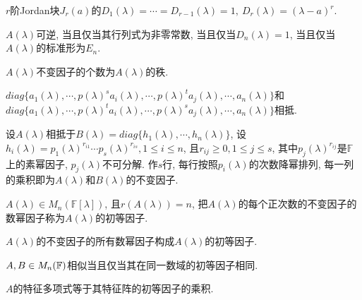 
\begin{example}
    $r$阶Jordan块$J_r(a)$的$D_1(\lambda)=\cdots=D_{r-1}(\lambda)=1,\ D_r(\lambda)=(\lambda-a)^r$.
\end{example}

\begin{example}
    $A(\lambda)$可逆, 当且仅当其行列式为非零常数, 当且仅当$D_n(\lambda)=1$, 当且仅当$A(\lambda)$的标准形为$E_n$.
\end{example}

\begin{statement}
    $A(\lambda)$不变因子的个数为$A(\lambda)$的秩.
\end{statement}

\begin{lemma}
    $diag\{a_1(\lambda),\cdots,p(\lambda)^sa_i(\lambda),\cdots,p(\lambda)^ta_j(\lambda),\cdots,a_n(\lambda)\}$和
    $diag\{a_1(\lambda),\cdots,p(\lambda)^ta_i(\lambda),\cdots,p(\lambda)^sa_j(\lambda),\cdots,a_n(\lambda)\}$相抵.
\end{lemma}

\begin{lemma}
    设$A(\lambda)$相抵于$B(\lambda)=diag\{h_1(\lambda),\cdots,h_n(\lambda)\}$, 
    设$h_i(\lambda)=p_1(\lambda)^{r_{i1}}\cdots p_s(\lambda)^{r_{is}}, 1\le i \le n$, 
    且$r_{ij}\ge 0, 1\le j \le s$, 其中$p_j(\lambda)^{r_{ij}}$是$\mathbb{F}$上的素幂因子, $p_j(\lambda)$不可分解. 
    作$s$行, 每行按照$p_i(\lambda)$的次数降幂排列, 每一列的乘积即为$A(\lambda)$和$B(\lambda)$的不变因子.
\end{lemma}

\begin{definition}[初等因子]
    $A(\lambda)\in M_n(\mathbb{F}[\lambda])$, 且$r(A(\lambda))=n$, 把$A(\lambda)$的每个正次数的不变因子的数幂因子称为$A(\lambda)$的初等因子.
\end{definition}

\begin{inference}
    $A(\lambda)$的不变因子的所有数幂因子构成$A(\lambda)$的初等因子.
\end{inference}

\begin{theorem}[矩阵相似的充要条件]
    $A,B\in M_{n}(\mathbb{F})$相似当且仅当其在同一数域的初等因子相同.
\end{theorem}

\begin{example}
    $A$的特征多项式等于其特征阵的初等因子的乘积.
\end{example}


